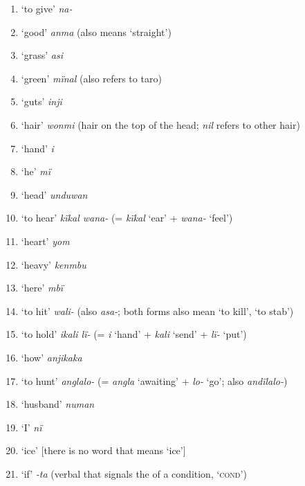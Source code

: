 \begin{enumerate}[noitemsep, label={\arabic*}, align=left, widest=190, labelsep=1ex,leftmargin=*]
\item ‘to give’ \textit{na-}

\item ‘good’ \textit{anma} (also means ‘straight’)

\item ‘grass’ \textit{asi}

\item ‘green’ \textit{mïnal} (also refers to taro)

\item ‘guts’ \textit{inji}

\item ‘hair’ \textit{wonmi} (hair on the top of the head; \textit{nil} refers to other hair)

\item ‘hand’ \textit{i}

\item ‘he’ \textit{mï}

\item ‘head’ \textit{unduwan}

\item ‘to hear’ \textit{kïkal wana-} (= \textit{kïkal} ‘ear’ + \textit{wana-} ‘feel’)

\item ‘heart’ \textit{yom}

\item ‘heavy’ \textit{kenmbu}

\item ‘here’ \textit{mbï}

\item ‘to hit’ \textit{wali-} (also \textit{asa-}; both forms also mean ‘to kill’, ‘to stab’)

\item ‘to hold’ \textit{ikali lï-} (= \textit{i} ‘hand’ + \textit{kali} ‘send’ + \textit{lï-} ‘put’)

\item ‘how’ \textit{anjikaka}

\item ‘to hunt’ \textit{anglalo-} (= \textit{angla} ‘awaiting’ + \textit{lo-} ‘go’; also \textit{andïlalo-})

\item ‘husband’ \textit{numan}

\item ‘I’ \textit{nï}

\item ‘ice’ [there is no word that means ‘ice’]

\item ‘if’ \textit{{}-ta} (verbal  that signals the  of a condition, ‘\textsc{cond}’)


\end{enumerate}
